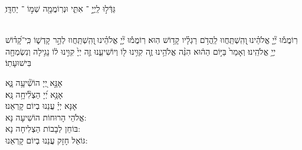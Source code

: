 \documentclass[twoside, openany, parskip=half, 11pt]{book}
\begin{document}
\shatz
ֽגַּדְּֿל֣וּ לַֽיְיָ֣ ־ אִתִּ֑י וּנְרֽוֹמֲמָ֖ה שְׁמ֣וֹ ־ יַחְדָּֽו׃

\\
רֽוֹמֲמ֡וּ יְ֘יָ֤ אֱלֹהֵ֗ינוּ ֖וְהִֽשְׁתַּֽחֲווּ לַֽהֲדֹ֥ם רַגְלָ֗יו קָד֥וֹשׁ הֽוּא׃ 
רֽוֹמֲמ֡וּ יְ֘יָ֤ אֱלֹהֵ֗ינוּ ֖וְהִֽשְׁתַּֽחֲווּ לְהַ֣ר קָדְשׁ֑וֹ כִּֽי־קָ֝ד֗וֹשׁ יְיָ֥ אֱלֹהֵֽינוּ׃
וְאָמַר֙ בַּיּ֣וֹם הַה֔וּא הִנֵּ֨ה אֱלֹהֵ֥ינוּ זֶ֛ה קִוִּ֥ינוּ ל֖וֹ וְיוֹשִׁיעֵ֑נוּ זֶ֤ה יְיָ֙ קִוִּ֣ינוּ ל֔וֹ נָגִ֥ילָה וְנִשְׂמְחָ֖ה בִּישׁוּעָתֽוֹ׃



אָנָּ֣א יְ֭יָ הוֹשִׁ֘יעָ֥ה נָּ֑א\\
 אָנָּ֥א יְ֝יָ הַצְלִ֘יחָ֥ה נָּֽא׃\\
  אָנָּא יְיָ֗ עֲנֵנוּ בְיוֹם קָרְאֵנוּ׃\\
  
 אֱלֹהֵי הָרוּחוֹת הוֹשִׁיעָה נָּא:\\ בּוֹחֵן לְבָבוֹת הַצְלִיחָה נָא:\\ גּוֹאֵל חָזָק עֲנֵנוּ בְיוֹם קָרְאֵנוּ:


\end{document}
